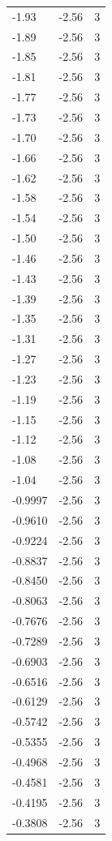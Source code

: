 \begin{longtable}{lrr}
  -1.93 & -2.56 & 3 \\
  -1.89 & -2.56 & 3 \\
  -1.85 & -2.56 & 3 \\
  -1.81 & -2.56 & 3 \\
  -1.77 & -2.56 & 3 \\
  -1.73 & -2.56 & 3 \\
  -1.70 & -2.56 & 3 \\
  -1.66 & -2.56 & 3 \\
  -1.62 & -2.56 & 3 \\
  -1.58 & -2.56 & 3 \\
  -1.54 & -2.56 & 3 \\
  -1.50 & -2.56 & 3 \\
  -1.46 & -2.56 & 3 \\
  -1.43 & -2.56 & 3 \\
  -1.39 & -2.56 & 3 \\
  -1.35 & -2.56 & 3 \\
  -1.31 & -2.56 & 3 \\
  -1.27 & -2.56 & 3 \\
  -1.23 & -2.56 & 3 \\
  -1.19 & -2.56 & 3 \\
  -1.15 & -2.56 & 3 \\
  -1.12 & -2.56 & 3 \\
  -1.08 & -2.56 & 3 \\
  -1.04 & -2.56 & 3 \\
  -0.9997 & -2.56 & 3 \\
  -0.9610 & -2.56 & 3 \\
  -0.9224 & -2.56 & 3 \\
  -0.8837 & -2.56 & 3 \\
  -0.8450 & -2.56 & 3 \\
  -0.8063 & -2.56 & 3 \\
  -0.7676 & -2.56 & 3 \\
  -0.7289 & -2.56 & 3 \\
  -0.6903 & -2.56 & 3 \\
  -0.6516 & -2.56 & 3 \\
  -0.6129 & -2.56 & 3 \\
  -0.5742 & -2.56 & 3 \\
  -0.5355 & -2.56 & 3 \\
  -0.4968 & -2.56 & 3 \\
  -0.4581 & -2.56 & 3 \\
  -0.4195 & -2.56 & 3 \\
  -0.3808 & -2.56 & 3 \\

\end{longtable}

